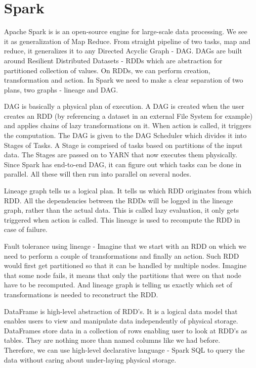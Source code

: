 \section{Spark}
Apache Spark \cite{ApacheSpark} \cite{SparkDefinitiveGuide} \cite{LearningSpark} is is an open-source engine for large-scale data processing. We see it as generalization of Map Reduce. From straight pipeline of two tasks, map and reduce, it generalizes it to any Directed Acyclic Graph - DAG. DAGs are built around Resilient Distributed Datasets - RDDs \cite{RDD} which are abstraction for partitioned collection of values. On RDDs, we can perform creation, transformation and action. In Spark we need to make a clear separation of two plans, two graphs - lineage and DAG.

DAG is basically a physical plan of execution. A DAG is created when the user creates an RDD (by referencing a dataset in an external File System for example) and applies chains of lazy transformations on it. When action is called, it triggers the computation. The DAG is given to the DAG Scheduler which divides it into Stages of Tasks. A Stage is comprised of tasks based on partitions of the input data. The Stages are passed on to YARN that now executes them physically. Since Spark has end-to-end DAG, it can figure out which tasks can be done in parallel. All these will then run into parallel on several nodes. 

Lineage graph tells us a logical plan. It tells us which RDD originates from which RDD. All the dependencies between the RDDs will be logged in the lineage graph, rather than the actual data. This is called lazy evaluation, it only gets triggered when action is called. This lineage is used to recompute the RDD in case of failure.

Fault tolerance using lineage - Imagine that we start with an RDD on which we need to perform a couple of transformations and finally an action. Such RDD would first get partitioned so that it can be handled by multiple nodes. Imagine that some node fails, it means that only the partitions that were on that node have to be recomputed. And lineage graph is telling us exactly which set of transformations is needed to reconstruct the RDD. 

DataFrame is high-level abstraction of RDD's. It is a logical data model that enables users to view and manipulate data independently of physical storage. DataFrames store data in a collection of rows enabling user to look at RDD's as tables. They are nothing more than named columns like we had before. Therefore, we can use high-level declarative language - Spark SQL to query the data without caring about under-laying physical storage.

